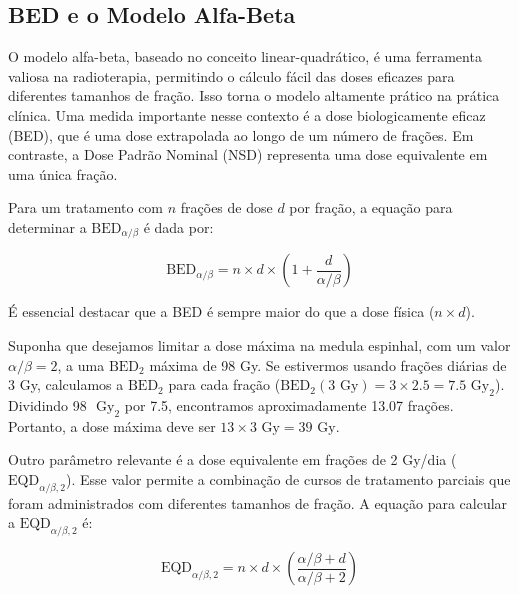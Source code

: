 \documentclass[11pt,a4paper]{article}
\begin{document}
\subsection*{BED e o Modelo Alfa-Beta}

	O modelo alfa-beta, baseado no conceito linear-quadrático, é uma ferramenta valiosa na radioterapia, permitindo o cálculo fácil das doses eficazes para diferentes tamanhos de fração. Isso torna o modelo altamente prático na prática clínica. Uma medida importante nesse contexto é a dose biologicamente eficaz (BED), que é uma dose extrapolada ao longo de um número de frações. Em contraste, a Dose Padrão Nominal (NSD) representa uma dose equivalente em uma única fração.

	Para um tratamento com $n$ frações de dose $d$ por fração, a equação para determinar a $\text{BED}_{\alpha/\beta}$ é dada por:

	\begin{equation}
		\text{BED}_{\alpha/\beta} = n \times d \times \left(1 + \frac{d}{\alpha/\beta}\right)
	\end{equation}

	É essencial destacar que a BED é sempre maior do que a dose física ($n \times d$).
	
	\begin{tcolorbox}[width=\textwidth, colback={white}, colbacktitle={DarkTurquoise!50!white}, title={$\bigstar$ \LobsterTwo{Exemplo: Cálculo do BED} $\bigstar $}, coltitle={CarnationPink}, colframe={DarkTurquoise}, fonttitle=\rmfamily\bfseries\Large, breakable]

		Suponha que desejamos limitar a dose máxima na medula espinhal, com um valor $\alpha/\beta = 2$, a uma $\text{BED}_2$ máxima de 98 Gy. Se estivermos usando frações diárias de 3 Gy, calculamos a $\text{BED}_2$ para cada fração ($\text{BED}_2(3 \text{ Gy}) = 3 \times 2.5 = 7.5 \text{ Gy}_2$). Dividindo 98 $\text{ Gy}_2$ por 7.5, encontramos aproximadamente 13.07 frações. Portanto, a dose máxima deve ser $13 \times 3 \text{ Gy} = 39 \text{ Gy}$.
	\end{tcolorbox}
	
	Outro parâmetro relevante é a dose equivalente em frações de 2 Gy/dia ($\text{EQD}_{\alpha/\beta, 2}$). Esse valor permite a combinação de cursos de tratamento parciais que foram administrados com diferentes tamanhos de fração. A equação para calcular a $\text{EQD}_{\alpha/\beta, 2}$ é:

	\begin{equation}
		\text{EQD}_{\alpha/\beta, 2} = n \times d \times \left(\frac{\alpha/\beta + d}{\alpha/\beta + 2}\right)
	\end{equation}
\end{document}
